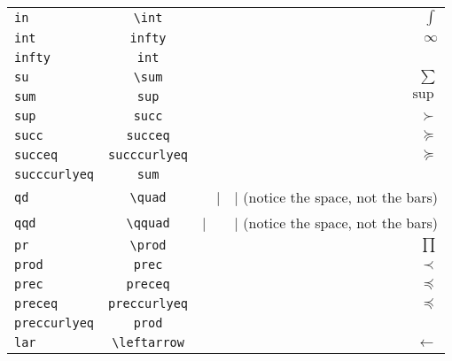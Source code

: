 \documentclass[a4paper,11pt]{scrartcl}
\begin{document}
\begin{table}[tb]
\begin{center}
\begin{tabular}{lcr}
    \verb|in|                                  &    \verb|\int|                               &    $\int$  \\
    \verb|int|                                 &    \verb|infty|                              &    $\infty$  \\
    \verb|infty|                               &    \verb|int|                                &    $\mbox{}$  \\
    \verb|su|                                  &    \verb|\sum|                               &    $\sum$  \\
    \verb|sum|                                 &    \verb|sup|                                &    $\sup$  \\
    \verb|sup|                                 &    \verb|succ|                               &    $\succ$  \\
    \verb|succ|                                &    \verb|succeq|                             &    $\succeq$  \\
    \verb|succeq|                              &    \verb|succcurlyeq|                        &    $\succcurlyeq$  \\
    \verb|succcurlyeq|                         &    \verb|sum|                                &    $\mbox{}$  \\
    \verb|qd|                                  &    \verb|\quad|                              &    $|\quad|$  \tiny{(notice the space, not the bars)}  \\
    \verb|qqd|                                 &    \verb|\qquad|                             &    $|\qquad|$  \tiny{(notice the space, not the bars)}  \\
    \verb|pr|                                  &    \verb|\prod|                              &    $\prod$  \\
    \verb|prod|                                &    \verb|prec|                               &    $\prec$  \\
    \verb|prec|                                &    \verb|preceq|                             &    $\preceq$  \\
    \verb|preceq|                              &    \verb|preccurlyeq|                        &    $\preccurlyeq$  \\
    \verb|preccurlyeq|                         &    \verb|prod|                               &    $\mbox{}$  \\
    \verb|lar|                                 &    \verb|\leftarrow|                         &    $\leftarrow$  \\

\end{tabular}
\end{center}
\end{table}
\end{document}
